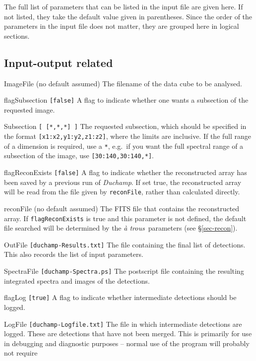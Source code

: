 \documentclass[12pt,a4paper]{article}
\newcommand{\eg}{e.g.\ }
\newcommand{\duchamp}{\emph{Duchamp}}
\newcommand{\atrous}{\textit{{\`a} trous}}
\newcommand{\entrylabel}[1]{\mbox{\textsf{\bf{#1:}}}\hfil}
\newenvironment{entry}
        {\begin{list}{}%
                {\renewcommand{\makelabel}{\entrylabel}%
                        \setlength{\labelwidth}{30mm}%
                        \setlength{\labelsep}{5pt}%
                        \setlength{\itemsep}{2pt}%
                        \setlength{\parsep}{2pt}%
                        \setlength{\leftmargin}{35mm}%
                }%
        }%
{\end{list}}
\begin{document}
The full list of parameters that can be listed in the input file are
given here. If not listed, they take the default value given in
parentheses. Since the order of the parameters in the input file does
not matter, they are grouped here in logical sections.

\subsection*{Input-output related}
\begin{entry}
\item[ImageFile (no default assumed)] The filename of the
  data cube to be analysed.
\item[flagSubsection \texttt{[false]}] A flag to indicate whether one
  wants a subsection of the requested image.
\item[Subsection \texttt{[ [*,*,*] ]}] The requested subsection, which
  should be specified in the format \texttt{[x1:x2,y1:y2,z1:z2]}, where
  the limits are inclusive. If the full range of a dimension is
  required, use a \texttt{*}, \eg if you want the full spectral range of
  a subsection of the image, use \texttt{[30:140,30:140,*]}.
\item[flagReconExists \texttt{[false]}] A flag to indicate whether the
  reconstructed array has been saved by a previous run of \duchamp. If
  set true, the reconstructed array will be read from the file given by
  \texttt{reconFile}, rather than calculated directly.
\item[reconFile (no default assumed)] The FITS file that contains the
  reconstructed array. If \texttt{flagReconExists} is true and this
  parameter is not defined, the default file searched will be
  determined by the \atrous\ parameters (see \S\ref{sec-recon}).
\item[OutFile \texttt{[duchamp-Results.txt]}] The file containing the
  final list of detections. This also records the list of input
  parameters.
\item[SpectraFile \texttt{[duchamp-Spectra.ps]}] The postscript file
  containing the resulting integrated spectra and images of the
  detections. 
\item[flagLog \texttt{[true]}] A flag to indicate whether intermediate
  detections should be logged.
\item[LogFile \texttt{[duchamp-Logfile.txt]}] The file in which intermediate
  detections are logged. These are detections that have not been
  merged. This is primarily for use in debugging and diagnostic
  purposes -- normal use of the program will probably not require

\end{entry}
\end{document}
